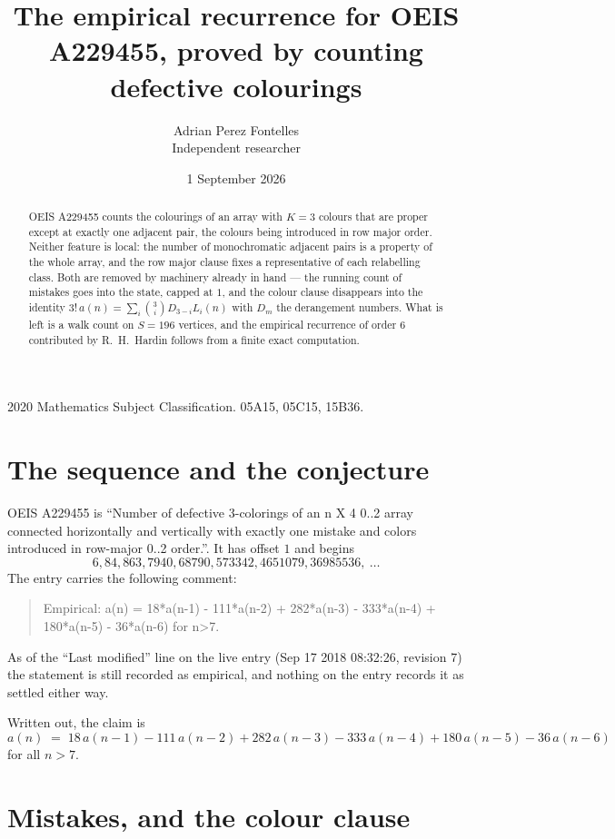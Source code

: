 \documentclass[11pt,a4paper]{article}
\title{The empirical recurrence for OEIS A229455, proved by counting defective colourings}
\author{Adrian Perez Fontelles\\ \small Independent researcher}
\date{1 September 2026}
\theoremstyle{plain}
\theoremstyle{definition}
\begin{document}
\maketitle

\begin{abstract}
OEIS A229455 counts the colourings of an array with $K=3$ colours that are proper except at
exactly one adjacent pair, the colours being introduced in row
major order. Neither feature is local: the number of monochromatic adjacent pairs is a
property of the whole array, and the row major clause fixes a representative of each
relabelling class. Both are removed by machinery already in hand --- the running count of
mistakes goes into the state, capped at $1$, and the colour clause disappears into the
identity $3!\,a(n)=\sum_i\binom{3}{i}D_{3-i}L_i(n)$ with $D_m$ the derangement
numbers. What is left is a walk count on $S=196$ vertices, and the empirical recurrence of
order $6$ contributed by R.~H.~Hardin follows from a finite exact computation.
\end{abstract}

\noindent\small 2020 Mathematics Subject Classification. 05A15, 05C15, 15B36.\normalsize

\section{The sequence and the conjecture}

OEIS A229455 is ``Number of defective 3-colorings of an n X 4 0..2 array connected horizontally and vertically with exactly one mistake and colors introduced in row-major 0..2 order.''. It has offset $1$ and begins
\[
6, 84, 863, 7940, 68790, 573342, 4651079, 36985536,\ \dots
\]
The entry carries the following comment:
\begin{quote}\small
Empirical: a(n) = 18*a(n-1) - 111*a(n-2) + 282*a(n-3) - 333*a(n-4) + 180*a(n-5) - 36*a(n-6) for n>7.
\end{quote}
As of the ``Last modified'' line on the live entry (Sep 17 2018 08:32:26, revision 7) the statement is
still recorded as empirical, and nothing on the entry records it as settled either way.

Written out, the claim is
\begin{equation}\label{eq:conj}
a(n)\;=\;18\,a(n-1) - 111\,a(n-2) + 282\,a(n-3) - 333\,a(n-4) + 180\,a(n-5) - 36\,a(n-6)
\end{equation}
for all $n>7$.

\section{Mistakes, and the colour clause}
\end{document}
